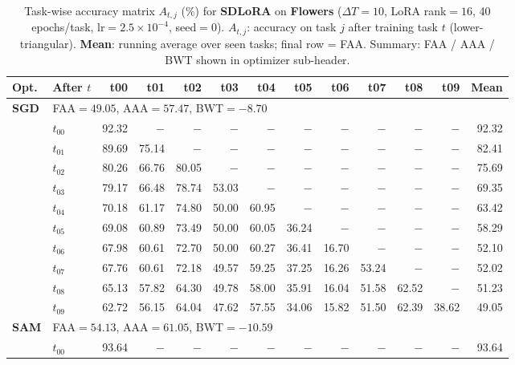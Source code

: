 \begin{table}[ht]
\centering
\caption{%
  Task-wise accuracy matrix $A_{t,j}$ (\%) for \textbf{SDLoRA} on \textbf{Flowers}
  ($\Delta T=10$, LoRA rank$=16$, 40 epochs/task, lr$=2.5\times10^{-4}$, seed$=0$).
  $A_{t,j}$: accuracy on task $j$ after training task $t$ (lower-triangular).
  \textbf{Mean}: running average over seen tasks; final row = FAA.
  Summary: FAA / AAA / BWT shown in optimizer sub-header.
}
\label{tab:raw_sdlora_flowers}
\setlength{\tabcolsep}{2.8pt}
\renewcommand{\arraystretch}{0.88}
\scriptsize
\begin{tabular}{@{}l l r r r r r r r r r r r@{}}
\toprule
\textbf{Opt.} & \textbf{After $t$} & \textbf{t00} & \textbf{t01} & \textbf{t02} & \textbf{t03} & \textbf{t04} & \textbf{t05} & \textbf{t06} & \textbf{t07} & \textbf{t08} & \textbf{t09} & \textbf{Mean} \\
\midrule
\multirow{11}{*}{\textbf{SGD}} & \multicolumn{12}{l}{\quad\small FAA$=49.05$,\; AAA$=57.47$,\; BWT$=-8.70$} \\
 & $t_{00}$ & 92.32 & $-$ & $-$ & $-$ & $-$ & $-$ & $-$ & $-$ & $-$ & $-$ & 92.32 \\
 & $t_{01}$ & 89.69 & 75.14 & $-$ & $-$ & $-$ & $-$ & $-$ & $-$ & $-$ & $-$ & 82.41 \\
 & $t_{02}$ & 80.26 & 66.76 & 80.05 & $-$ & $-$ & $-$ & $-$ & $-$ & $-$ & $-$ & 75.69 \\
 & $t_{03}$ & 79.17 & 66.48 & 78.74 & 53.03 & $-$ & $-$ & $-$ & $-$ & $-$ & $-$ & 69.35 \\
 & $t_{04}$ & 70.18 & 61.17 & 74.80 & 50.00 & 60.95 & $-$ & $-$ & $-$ & $-$ & $-$ & 63.42 \\
 & $t_{05}$ & 69.08 & 60.89 & 73.49 & 50.00 & 60.05 & 36.24 & $-$ & $-$ & $-$ & $-$ & 58.29 \\
 & $t_{06}$ & 67.98 & 60.61 & 72.70 & 50.00 & 60.27 & 36.41 & 16.70 & $-$ & $-$ & $-$ & 52.10 \\
 & $t_{07}$ & 67.76 & 60.61 & 72.18 & 49.57 & 59.25 & 37.25 & 16.26 & 53.24 & $-$ & $-$ & 52.02 \\
 & $t_{08}$ & 65.13 & 57.82 & 64.30 & 49.78 & 58.00 & 35.91 & 16.04 & 51.58 & 62.52 & $-$ & 51.23 \\
 & $t_{09}$ & 62.72 & 56.15 & 64.04 & 47.62 & 57.55 & 34.06 & 15.82 & 51.50 & 62.39 & 38.62 & 49.05 \\
\midrule
\multirow{11}{*}{\textbf{SAM}} & \multicolumn{12}{l}{\quad\small FAA$=54.13$,\; AAA$=61.05$,\; BWT$=-10.59$} \\
 & $t_{00}$ & 93.64 & $-$ & $-$ & $-$ & $-$ & $-$ & $-$ & $-$ & $-$ & $-$ & 93.64 \\

\end{tabular}
\end{table}
